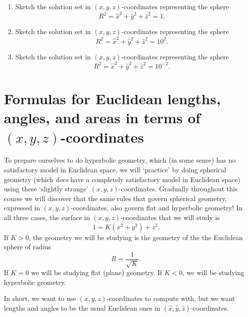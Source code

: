 \documentclass[newpage,hints,handout]{ximera}
\begin{document}
\begin{problem}\hfil
\begin{enumerate}
\item Sketch the solution set in $\left(  x,y,z\right)  $-coordinates
representing the sphere%
\[
R^{2}=\hat{x}^{2}+\hat{y}^{2}+\hat{z}^{2}=1.
\]

\item Sketch the solution set in $\left(  x,y,z\right)  $-coordinates
representing the sphere%
\[
R^{2}=\hat{x}^{2}+\hat{y}^{2}+\hat{z}^{2}=10^{2}.
\]

\item Sketch the solution set in $\left(  x,y,z\right)  $-coordinates
representing the sphere%
\[
R^{2}=\hat{x}^{2}+\hat{y}^{2}+\hat{z}^{2}=10^{-2}.
\]
\end{enumerate}
%
\end{problem}

\section{Formulas for Euclidean lengths, angles, and areas in terms of $(x,y,z)$-coordinates}

To prepare ourselves to do hyperbolic geometry, which (in some sense)
has no satisfactory model in Euclidean space, we will `practice' by
doing spherical geometry (which \textit{does} have a completely
satisfactory model in Euclidean space) using these `slightly strange'
$\left( x,y,z\right) $-coordinates. Gradually throughout this course
we will discover that the same rules that govern spherical geometry,
expressed in $\left( x,y,z\right) $-coordinates, also govern flat and
hyperbolic geometry! In all three cases, the surface in $\left(
x,y,z\right) $-coordinates that we will study is%
\[
1=K\left(x^{2}+y^{2}\right)+z^{2} .
\]
If $K>0$, the geometry we will be studying is the geometry of the the
Euclidean sphere of radius%
\[
R=\frac{1}{\sqrt{K}}.
\]
If $K=0$ we will be studying flat (plane) geometry. If $K<0$, we will be
studying hyperbolic geometry. 

In short, we want to use $\left(  x,y,z\right)  $-coordinates to compute with,
but we want lengths and angles to be the usual Euclidean ones in $\left(
\hat{x},\hat{y},\hat{z}\right)  $-coordinates.
\end{document}
